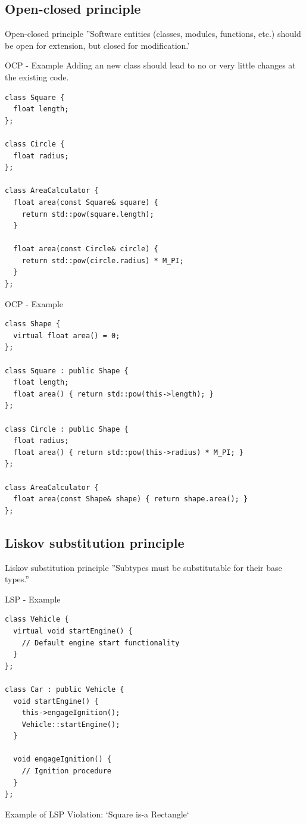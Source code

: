 \documentclass{beamer}
\begin{document}
\subsection{Open-closed principle}

\begin{frame}{Open-closed principle}
''Software entities (classes, modules, functions, etc.) should be open for
extension, but closed for modification.'
\end{frame}

\begin{frame}[fragile]{OCP - Example}
Adding an new class should lead to no or very little changes at the existing
code.

\begin{lstlisting}[caption=OCP Anti-Example]
class Square {
  float length;
};

class Circle {
  float radius;
};

class AreaCalculator {
  float area(const Square& square) {
    return std::pow(square.length);
  }
  
  float area(const Circle& circle) {
    return std::pow(circle.radius) * M_PI;
  }
};
\end{lstlisting}
\end{frame}

\begin{frame}[fragile]{OCP - Example}
\begin{lstlisting}[caption=OCP Example]
class Shape {
  virtual float area() = 0;
};

class Square : public Shape {
  float length;
  float area() { return std::pow(this->length); }
};

class Circle : public Shape {
  float radius;
  float area() { return std::pow(this->radius) * M_PI; }
};

class AreaCalculator {
  float area(const Shape& shape) { return shape.area(); }
};
\end{lstlisting}
\end{frame}


\subsection{Liskov substitution principle}

\begin{frame}{Liskov substitution principle}
''Subtypes must be substitutable for their base types.''
\end{frame}

\begin{frame}[fragile]{LSP - Example}
\begin{lstlisting}[caption=LSP Example]
class Vehicle {
  virtual void startEngine() {
    // Default engine start functionality
  }
};

class Car : public Vehicle {
  void startEngine() {
    this->engageIgnition();
    Vehicle::startEngine();
  }

  void engageIgnition() {
    // Ignition procedure
  }
};
\end{lstlisting}
Example of LSP Violation: `Square is-a Rectangle`
\end{frame}
\end{document}
